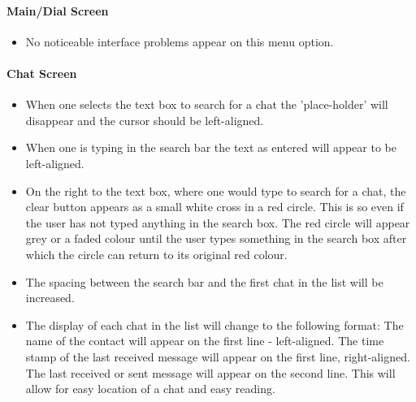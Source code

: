 \documentclass[11pt]{article}
\begin{document}
\paragraph{Main/Dial Screen}
\begin{itemize}
\item No noticeable interface problems appear on this menu option.
\end{itemize}

\paragraph{Chat Screen}
\begin{itemize}
\item	When one selects the text box to search for a chat the 'place-holder' will disappear and the cursor should be left-aligned.

\item When one is typing in the search bar the text as entered will appear to be left-aligned.

\item On the right to the text box, where one would type to search for a chat, the clear button appears as a small white cross in a red circle. This is so even if the user has not typed anything in the search box. The red circle will appear grey or a faded colour until the user types something in the search box after which the circle can return to its original red colour. 

\item The spacing between the search bar and the first chat in the list will be increased.

\item The display of each chat in the list will change to the following format:
\subitem The name of the contact will appear on the first line - left-aligned.
\subitem The time stamp of the last received message will appear on the first line, right-aligned.
\subitem The last received or sent message will appear on the second line. This will allow for easy location of a chat and easy reading.
\end{itemize}
\end{document}
